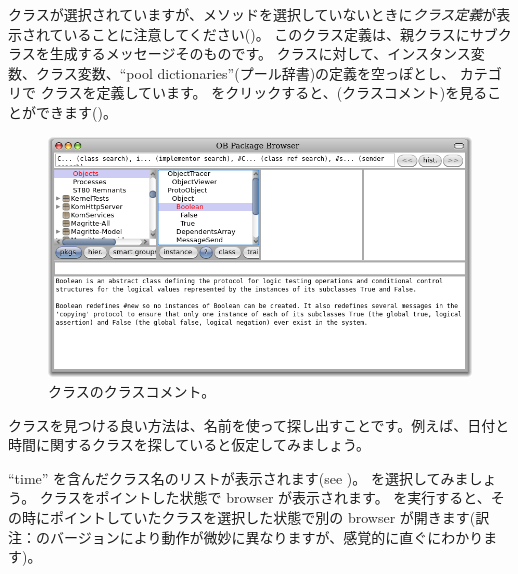 \documentclass[a4paper,10pt,twoside]{book}
\begin{document}
 クラスが選択されていますが、メソッドを選択していないときに\emph{クラス定義}が表示されていることに注意してください()。
このクラス定義は、親クラスにサブクラスを生成するメッセージそのものです。
 クラスに対して、インスタンス変数、クラス変数、``pool dictionaries''(プール辞書)の定義を空っぽとし、 カテゴリで  クラスを定義しています。
 をクリックすると、(クラスコメント)を見ることができます()。

\begin{figure}[hbt]
\centerline {\includegraphics[width=\textwidth]{classComment}}
\caption{ クラスのクラスコメント。
}
\end{figure}

クラスを見つける良い方法は、名前を使って探し出すことです。例えば、日付と時間に関するクラスを探していると仮定してみましょう。

\noindent
``time'' を含んだクラス名のリストが表示されます(see )。 を選択してみましょう。 クラスをポイントした状態で browser が表示されます。 を実行すると、その時にポイントしていたクラスを選択した状態で別の browser が開きます(訳注：\pharo のバージョンにより動作が微妙に異なりますが、感覚的に直ぐにわかります)。
\end{document}
